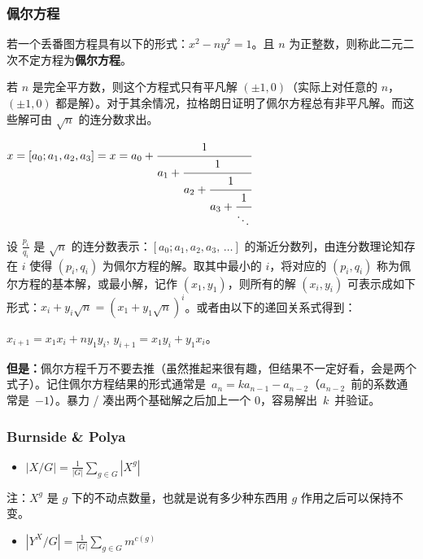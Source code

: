 \documentclass[]{article}
\providecommand{\tightlist}{%
  \setlength{\itemsep}{0pt}\setlength{\parskip}{0pt}}
\begin{document}
\hypertarget{ux4f69ux5c14ux65b9ux7a0b}{%
\subsubsection{佩尔方程}\label{ux4f69ux5c14ux65b9ux7a0b}}

若一个丢番图方程具有以下的形式：\(x^2 - ny^2= 1\)。且 \(n\)
为正整数，则称此二元二次不定方程为\textbf{佩尔方程}。

若 \(n\) 是完全平方数，则这个方程式只有平凡解
\((\pm 1,0)\)（实际上对任意的 \(n\)，\((\pm 1,0)\)
都是解）。对于其余情况，拉格朗日证明了佩尔方程总有非平凡解。而这些解可由
\(\sqrt{n}\) 的连分数求出。

\(x = [a_0; a_1, a_2, a_3]=x = a_0 + \cfrac{1}{a_1 + \cfrac{1}{a_2 + \cfrac{1}{a_3 + \cfrac{1}{\ddots\,}}}}\)

设 \(\tfrac{p_i}{q_i}\) 是 \(\sqrt{n}\)
的连分数表示：\([a_{0}; a_{1}, a_{2}, a_{3}, \,\ldots ]\)
的渐近分数列，由连分数理论知存在 \(i\) 使得 \((p_i,q_i)\)
为佩尔方程的解。取其中最小的 \(i\)，将对应的 \((p_i,q_i)\)
称为佩尔方程的基本解，或最小解，记作 \((x_1,y_1)\)，则所有的解
\((x_i,y_i)\)
可表示成如下形式：\(x_{i}+y_{i}{\sqrt n}=(x_{1}+y_{1}{\sqrt n})^{i}\)。或者由以下的递回关系式得到：

\(\displaystyle x_{i+1} = x_1 x_i + n y_1 y_i\),
\(\displaystyle y_{{i+1}}=x_{1}y_{i}+y_{1}x_{i}\)。

\textbf{但是：}佩尔方程千万不要去推（虽然推起来很有趣，但结果不一定好看，会是两个式子）。记住佩尔方程结果的形式通常是~\(a_n=ka_{n−1}−a_{n−2}\)（\(a_{n−2}\)~前的系数通常是~\(−1\)）。暴力
/ 凑出两个基础解之后加上一个 \(0\)，容易解出~\(k\)~并验证。

\hypertarget{burnside-polya}{%
\subsubsection{Burnside \& Polya}\label{burnside-polya}}

\begin{itemize}
\tightlist
\item
  \(|X/G|={\frac {1}{|G|}}\sum _{{g\in G}}|X^{g}|\)
\end{itemize}

注：\(X^g\) 是 \(g\) 下的不动点数量，也就是说有多少种东西用 \(g\)
作用之后可以保持不变。

\begin{itemize}
\tightlist
\item
  \(|Y^X/G| = \frac{1}{|G|}\sum_{g \in G} m^{c(g)}\)
\end{itemize}
\end{document}
